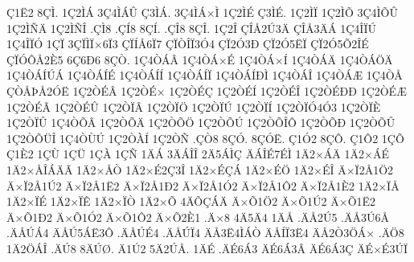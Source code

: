 {^^c71^^cb2
8^^c7^^cc.
1^^c72^^cc^^c1
3^^c74^^cc^^c1^^db
^^c73^^cc^^c1.
3^^c74^^cc^^c1^^d7^^cc
1^^c72^^cc^^c9
^^c73^^cc^^c9.
1^^c72^^cc^^cf
1^^c72^^cc^^d5
3^^c74^^cc^^d5^^db
1^^c72^^cc^^d1^^c4
1^^c72^^cc^^d1^^ce
.^^c7^^cc8
.^^c7^^cd8
8^^c7^^cd.
.^^c7^^ce8
8^^c7^^ce.
1^^c72^^ce
^^c7^^ce^^c52^^da3^^c4
^^c7^^ce^^c53^^c4^^c1
1^^c74^^ce^^cf^^da
1^^c74^^ce^^cf^^d3
1^^c7^^cf
3^^c7^^cf^^cc^^cf^^d76^^cf3
^^c7^^cf^^cd^^c56^^cf7
^^c7^^cf^^d2^^ce^^cf3^^d34
^^c7^^cf2^^d33^^d0
^^c7^^cf2^^d35^^cb^^cf
^^c7^^cf2^^d35^^d52^^ce^^c9
^^c7^^cf^^d3^^d4^^c52^^c85
6^^c76^^d06
8^^c7^^d2.
1^^c74^^d2^^c1^^c2
1^^c74^^d2^^c1^^d7^^c9
1^^c74^^d2^^c1^^d7^^cd
1^^c74^^d2^^c1^^c4
1^^c74^^d2^^c1^^d6^^c4
1^^c74^^d2^^c1^^cd^^da^^c1
1^^c74^^d2^^c1^^cd^^c9
1^^c74^^d2^^c1^^cd^^cd
1^^c74^^d2^^c1^^cd^^cf
1^^c74^^d2^^c1^^cd^^d0^^cc
1^^c74^^d2^^c1^^ce
1^^c74^^d2^^c1^^c6
1^^c74^^d2^^c5
^^c7^^d2^^c5^^de^^c52^^d3^^cb
1^^c72^^d2^^c9^^c2
1^^c72^^d2^^c9^^d7
1^^c72^^d2^^c9^^c7
1^^c72^^d2^^c9^^cd
1^^c72^^d2^^c9^^ce
1^^c72^^d2^^c9^^d0^^d0
1^^c72^^d2^^c9^^c6
1^^c72^^d2^^c9^^c3
1^^c72^^d2^^c9^^db
1^^c72^^d2^^cf^^c2
1^^c72^^d2^^cf^^d6
1^^c72^^d2^^cf^^da
1^^c72^^d2^^cf^^cd
1^^c72^^d2^^cf^^d34^^d33
1^^c72^^d2^^cf^^c8
1^^c72^^d2^^cf^^db
1^^c74^^d2^^d5^^c2
1^^c72^^d2^^d5^^c4
1^^c72^^d2^^d5^^d6
1^^c72^^d2^^d5^^da
1^^c72^^d2^^d5^^ce^^d4
1^^c72^^d2^^d5^^d0
1^^c72^^d2^^d5^^db
1^^c72^^d2^^d5^^dc^^ce
1^^c74^^d2^^d9^^da
1^^c72^^d2^^c0^^cd
1^^c72^^d2^^d1
.^^c7^^d28
8^^c7^^d3.
8^^c7^^d3^^cb.
^^c71^^d32
8^^c7^^d4.
^^c71^^d42
1^^c7^^d5
^^c71^^c82
1^^c7^^d9
1^^c7^^dc
1^^c7^^c0
1^^c7^^d1
1^^c4^^c1
3^^c4^^c1^^ce^^ce
2^^c45^^c1^^cc^^c7
^^c4^^c1^^ce^^c97^^c9^^cc
1^^c42^^d7^^c1^^c4
1^^c42^^d7^^c1^^c9
1^^c42^^d7^^c5^^ce^^c1^^c4^^c3
1^^c42^^d7^^c5^^d2
1^^c42^^d7^^c92^^c73^^ce
1^^c42^^d7^^c9^^c7^^c1
1^^c42^^d7^^c9^^d6
1^^c42^^d7^^c9^^ce
^^c4^^d7^^cf2^^c51^^d62
^^c4^^d7^^cf2^^c51^^da2
^^c4^^d7^^cf2^^c51^^cb2
^^c4^^d7^^cf2^^c51^^d02
^^c4^^d7^^cf2^^c51^^d32
^^c4^^d7^^cf2^^c51^^d42
^^c4^^d7^^cf2^^c51^^c82
1^^c42^^d7^^cf^^c5
1^^c42^^d7^^cf^^c9
1^^c42^^d7^^cf^^ca
1^^c42^^d7^^cf^^d2
1^^c42^^d7^^d5
4^^c4^^d5^^c7^^c1^^c4
^^c4^^d7^^d51^^d62
^^c4^^d7^^d51^^da2
^^c4^^d7^^d51^^cb2
^^c4^^d7^^d51^^d02
^^c4^^d7^^d51^^d32
^^c4^^d7^^d51^^d42
^^c4^^d7^^d52^^c81
.^^c4^^d78
4^^c45^^c44
1^^c4^^c5
.^^c4^^c52^^da5
.^^c4^^c53^^da6^^c5
.^^c4^^c5^^da^^c14
^^c4^^c5^^da5^^c1^^cb3^^d4
.^^c4^^c5^^da^^c94
.^^c4^^c5^^da^^cf4
^^c4^^c53^^cb4^^cc^^c1^^d2
^^c4^^c5^^cd^^cf3^^cb4
^^c4^^c52^^d23^^d6^^c1^^d7
.^^c4^^d68
1^^c42^^d6^^c1^^ce
.^^c4^^da8
8^^c4^^da^^d8.
^^c41^^da2
5^^c42^^da^^c5.
1^^c4^^c9
.^^c4^^c96^^c13
^^c4^^c96^^c13^^c2
^^c4^^c96^^c13^^c7
^^c4^^c9^^d7^^c93^^da^^cf
}

